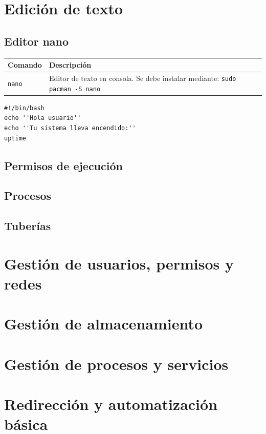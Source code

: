 \newpage
\section{Edición de texto}

\subsection{Editor nano}

\begin{center}
\renewcommand{\arraystretch}{1.3}
\begin{tabular}{|p{5.5cm}|p{9.5cm}|}
\hline
\textbf{Comando} & \textbf{Descripción} \\ \hline
\lstinline!nano! & Editor de texto en consola. Se debe instalar mediante: \lstinline!sudo pacman -S nano! \\ \hline
\end{tabular}
\end{center}

\begin{ejemplo}
\begin{lstlisting}
#!/bin/bash
echo ''Hola usuario''
echo ''Tu sistema lleva encendido:''
uptime
\end{lstlisting}
\end{ejemplo}

\subsection{Permisos de ejecución}

\subsection{Procesos}

\subsection{Tuberías}

\newpage
\section{Gestión de usuarios, permisos y redes}

\newpage
\section{Gestión de almacenamiento}

\newpage
\section{Gestión de procesos y servicios}

\newpage
\section{Redirección y automatización básica}